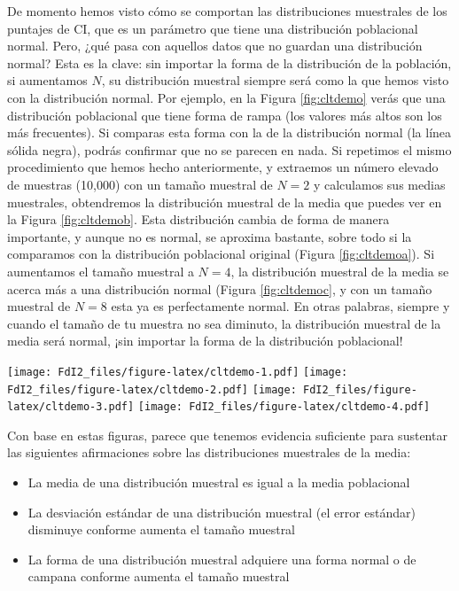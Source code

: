 \documentclass[spanish,]{book}
\providecommand{\tightlist}{%
  \setlength{\itemsep}{0pt}\setlength{\parskip}{0pt}}
\begin{document}
De momento hemos visto cómo se comportan las distribuciones muestrales
de los puntajes de CI, que es un parámetro que tiene una distribución
poblacional normal. Pero, ¿qué pasa con aquellos datos que no guardan
una distribución normal? Esta es la clave: sin importar la forma de la
distribución de la población, si aumentamos \(N\), su distribución
muestral siempre será como la que hemos visto con la distribución
normal. Por ejemplo, en la Figura \ref{fig:cltdemo} verás que una
distribución poblacional que tiene forma de rampa (los valores más altos
son los más frecuentes). Si comparas esta forma con la de la
distribución normal (la línea sólida negra), podrás confirmar que no se
parecen en nada. Si repetimos el mismo procedimiento que hemos hecho
anteriormente, y extraemos un número elevado de muestras (10,000) con un
tamaño muestral de \(N=2\) y calculamos sus medias muestrales,
obtendremos la distribución muestral de la media que puedes ver en la
Figura \ref{fig:cltdemob}. Esta distribución cambia de forma de manera
importante, y aunque no es normal, se aproxima bastante, sobre todo si
la comparamos con la distribución poblacional original (Figura
\ref{fig:cltdemoa}). Si aumentamos el tamaño muestral a \(N=4\), la
distribución muestral de la media se acerca más a una distribución
normal (Figura \ref{fig:cltdemoc}, y con un tamaño muestral de \(N=8\)
esta ya es perfectamente normal. En otras palabras, siempre y cuando el
tamaño de tu muestra no sea diminuto, la distribución muestral de la
media será normal, ¡sin importar la forma de la distribución
poblacional!

\texttt{[image: FdI2\_files/figure-latex/cltdemo-1.pdf]}
\texttt{[image: FdI2\_files/figure-latex/cltdemo-2.pdf]}
\texttt{[image: FdI2\_files/figure-latex/cltdemo-3.pdf]}
\texttt{[image: FdI2\_files/figure-latex/cltdemo-4.pdf]}

Con base en estas figuras, parece que tenemos evidencia suficiente para
sustentar las siguientes afirmaciones sobre las distribuciones
muestrales de la media:

\begin{itemize}
\tightlist
\item
  La media de una distribución muestral es igual a la media poblacional
\item
  La desviación estándar de una distribución muestral (el error
  estándar) disminuye conforme aumenta el tamaño muestral
\item
  La forma de una distribución muestral adquiere una forma normal o de
  campana conforme aumenta el tamaño muestral
\end{itemize}
\end{document}
